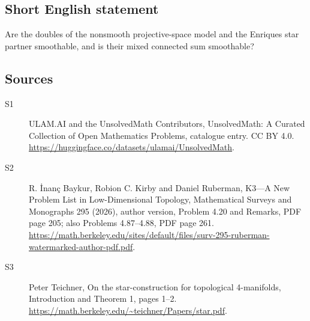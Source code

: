 \documentclass[11pt]{article}
\begin{document}
\subsection{Short English statement}
Are the doubles of the nonsmooth projective-space model and the Enriques star partner smoothable, and is their mixed connected sum smoothable?
\subsection{Sources}
\begin{description}
\item[\hypertarget{source:statement:1}{S1}] ULAM.AI and the UnsolvedMath Contributors, UnsolvedMath: A Curated Collection of Open Mathematics Problems, catalogue entry. CC BY 4.0. \url{https://huggingface.co/datasets/ulamai/UnsolvedMath}.
\item[\hypertarget{source:statement:2}{S2}] R. İnanç Baykur, Robion C. Kirby and Daniel Ruberman, K3—A New Problem List in Low-Dimensional Topology, Mathematical Surveys and Monographs 295 (2026), author version, Problem 4.20 and Remarks, PDF page 205; also Problems 4.87--4.88, PDF page 261. \url{https://math.berkeley.edu/sites/default/files/surv-295-ruberman-watermarked-author-pdf.pdf}.
\item[\hypertarget{source:statement:3}{S3}] Peter Teichner, On the star-construction for topological 4-manifolds, Introduction and Theorem 1, pages 1--2. \url{https://math.berkeley.edu/~teichner/Papers/star.pdf}.
\end{description}
\label{end:statement}
\end{document}
